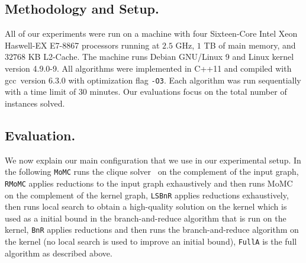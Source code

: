 \documentclass[twoside,leqno,twocolumn]{article}
\begin{document}
\subsection{Methodology and Setup.}
All of our experiments were run on a machine with  four Sixteen-Core Intel Xeon Haswell-EX E7-8867 processors running at $2.5$ GHz, $1$ TB of main memory, and $32768$ KB L2-Cache.
The machine runs Debian GNU/Linux 9 and Linux kernel version 4.9.0-9.
All algorithms were implemented in C++11 and compiled with gcc~version 6.3.0 with optimization flag \texttt{-O3}.
Each algorithm was run sequentially with a time limit of 30 minutes. Our evaluations focus on the total number of instances solved.
\subsection{Evaluation.}
We now explain our main configuration that we use in our experimental setup.
In the following \texttt{MoMC} runs the clique solver~\cite{DBLP:journals/cor/LiJM17} on the complement of the input graph, \texttt{RMoMC} applies reductions to the input graph exhaustively and then runs MoMC on the complement of the kernel graph, \texttt{LSBnR} applies reductions exhaustively, then runs local search to obtain a high-quality solution on the kernel which is used as a initial bound in the branch-and-reduce algorithm that is run on the kernel, \texttt{BnR} applies reductions and then runs the branch-and-reduce algorithm on the kernel (no local search is used to improve an initial bound), \texttt{FullA} is the full algorithm as described above.


\end{document}
